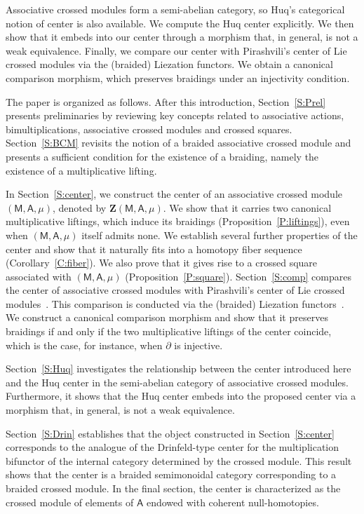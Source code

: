 \documentclass[12pt,reqno]{amsart}
\theoremstyle{plain}
\theoremstyle{definition}
\theoremstyle{remark}
\newcommand{\A}{\ensuremath{\mathsf{A}}}
\newcommand{\MM}{\ensuremath{\mathsf{M}}}
\newcommand{\ZC}{\ensuremath{\mathbf{Z}}}
\numberwithin{equation}{section}
\begin{document}
Associative crossed modules form a semi-abelian category, so Huq's categorical
notion of center is also available. We compute the Huq center explicitly. We
then show that it embeds into our center through a morphism that, in general, is not a weak equivalence. Finally, we compare our center with Pirashvili's center of Lie
crossed modules via the (braided) Liezation functors. We obtain a canonical
comparison morphism, which preserves braidings under an injectivity condition.



The paper is organized as follows. After this introduction, Section~\ref{S:Prel}  presents preliminaries by
reviewing key concepts related to associative actions, bimultiplications,  associative crossed modules and  crossed squares.
 Section~\ref{S:BCM} revisits the notion of a braided associative crossed module and presents a sufficient condition for the existence of a braiding, namely the existence of a multiplicative lifting.

In Section~\ref{S:center}, we construct the  center of an associative  crossed module $(\MM,\A,\mu)$, denoted by $\ZC(\MM,\A,\mu)$.
 We show that it carries two canonical multiplicative liftings, which induce its braidings (Proposition~\ref{P:liftings}), even when $(\MM,\A,\mu)$ itself admits none.
  We establish several further properties of the center and show that it naturally fits into a homotopy fiber sequence (Corollary~\ref{C:fiber}).
   We also prove that it gives rise to a crossed square associated with $(\MM,\A,\mu)$ (Proposition~\ref{P:square}).
    Section~\ref{S:comp} compares the center of associative crossed modules with Pirashvili's center of Lie
crossed modules~\cite{Pim2}. This comparison is conducted via the (braided) Liezation functors~\cite{FFL1}.
 We construct a canonical comparison morphism and show that it preserves braidings if and only if the two multiplicative liftings of the center coincide, which is the case, for instance, when $\partial$ is injective.

Section~\ref{S:Huq} investigates the relationship between the center introduced here and the Huq center in the semi-abelian category of associative crossed modules.
 Furthermore, it shows that the Huq center embeds into the proposed center via a morphism that, in general, is not a weak equivalence.  

Section~\ref{S:Drin}  establishes that the object constructed in Section~\ref{S:center} corresponds to  the analogue of the  Drinfeld-type center for the multiplication bifunctor
 of the  internal category determined by the crossed module. This result shows that the center is a
braided semimonoidal category corresponding to a braided crossed module. 
In the final section, the center is characterized as the crossed module of elements of $\A$ endowed with coherent null-homotopies.
\end{document}
